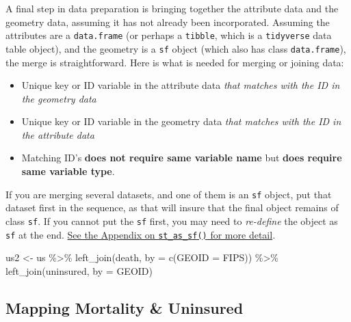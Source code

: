 \documentclass[
]{book}
\newenvironment{Shaded}{\begin{snugshade}}{\end{snugshade}}
\newcommand{\AttributeTok}[1]{\textcolor[rgb]{0.77,0.63,0.00}{#1}}
\newcommand{\FunctionTok}[1]{\textcolor[rgb]{0.00,0.00,0.00}{#1}}
\newcommand{\NormalTok}[1]{#1}
\newcommand{\OtherTok}[1]{\textcolor[rgb]{0.56,0.35,0.01}{#1}}
\newcommand{\SpecialCharTok}[1]{\textcolor[rgb]{0.00,0.00,0.00}{#1}}
\newcommand{\StringTok}[1]{\textcolor[rgb]{0.31,0.60,0.02}{#1}}
\providecommand{\tightlist}{%
  \setlength{\itemsep}{0pt}\setlength{\parskip}{0pt}}
\begin{document}
A final step in data preparation is bringing together the attribute data and the geometry data, assuming it has not already been incorporated. Assuming the attributes are a \texttt{data.frame} (or perhaps a \texttt{tibble}, which is a \texttt{tidyverse} data table object), and the geometry is a \texttt{sf} object (which also has class \texttt{data.frame}), the merge is straightforward. Here is what is needed for merging or joining data:

\begin{itemize}
\tightlist
\item
  Unique key or ID variable in the attribute data \emph{that matches with the ID in the geometry data}
\item
  Unique key or ID variable in the geometry data \emph{that matches with the ID in the attribute data}
\item
  Matching ID's \textbf{does not require same variable name} but \textbf{does require same variable type}.
\end{itemize}

If you are merging several datasets, and one of them is an \texttt{sf} object, put that dataset first in the sequence, as that will insure that the final object remains of class \texttt{sf}. If you cannot put the \texttt{sf} first, you may need to \emph{re-define} the object as \texttt{sf} at the end. \protect\hyperlink{st-as-sf}{See the Appendix on \texttt{st\_as\_sf()} for more detail}.

\begin{Shaded}
\begin{Highlighting}[]
\NormalTok{us2 }\OtherTok{\textless{}{-}}\NormalTok{ us }\SpecialCharTok{\%\textgreater{}\%}
  \FunctionTok{left\_join}\NormalTok{(death, }\AttributeTok{by =} \FunctionTok{c}\NormalTok{(}\StringTok{\textquotesingle{}GEOID\textquotesingle{}} \OtherTok{=} \StringTok{\textquotesingle{}FIPS\textquotesingle{}}\NormalTok{)) }\SpecialCharTok{\%\textgreater{}\%}
  \FunctionTok{left\_join}\NormalTok{(uninsured, }\AttributeTok{by =} \StringTok{\textquotesingle{}GEOID\textquotesingle{}}\NormalTok{)}
\end{Highlighting}
\end{Shaded}

\hypertarget{mapping-mortality-uninsured}{%
\subsection{Mapping Mortality \& Uninsured}\label{mapping-mortality-uninsured}}
\end{document}
